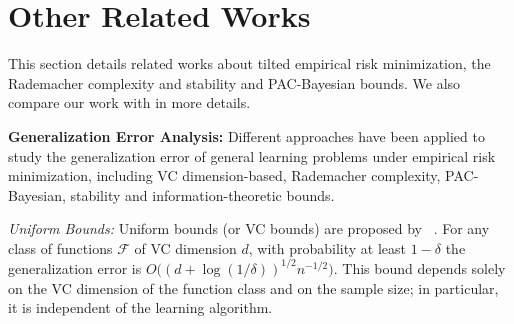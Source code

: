 \documentclass{article}
\theoremstyle{plain}
\theoremstyle{plain}
\theoremstyle{definition}
\theoremstyle{remark}
\begin{document}

\section{Other Related Works}\label{app: related work}
This section details related works about tilted empirical risk minimization, the Rademacher complexity and stability and PAC-Bayesian bounds. We also compare our work with \citet{behnamnialog} in more details.

\textbf{Generalization Error Analysis:} Different approaches have been applied to study the generalization error of general learning problems under empirical risk minimization, including  VC dimension-based, Rademacher complexity, PAC-Bayesian, stability and information-theoretic bounds. 

\textit{Uniform Bounds:}  Uniform bounds (or VC bounds) are proposed by ~\citet{vapnik2015uniform,DBLP:journals/neco/BartlettMM98,bartlett19}. For any class of functions $\mathcal{F}$ of VC dimension $d$, with probability at least $1-\delta$ the  %
generalization error is $O\big((d+\log(1/\delta))^{1/2}n^{-1/2}\big)$. This bound depends solely on the VC dimension of the function class and on the sample size; in particular, it is independent of the learning algorithm.
\end{document}
